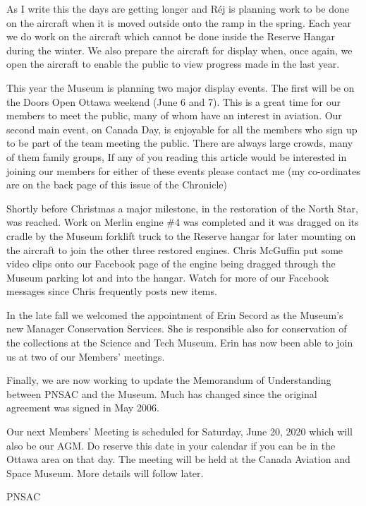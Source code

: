 
As I write this the days are getting longer and R\'{e}j is planning work to
be done on the aircraft when it is moved outside onto the ramp in the
spring. Each year we do work on the aircraft which cannot be done
inside the Reserve Hangar during the winter. We also prepare the
aircraft for display when, once again, we open the aircraft to enable
the public to view progress made in the last year.

This year the Museum is planning two major display events. The first will be
on the Doors Open Ottawa weekend (June 6 and 7). This is a great time
for our members to meet the public, many of whom have an interest in
aviation. Our second main event, on Canada Day, is enjoyable for all
the members who sign up to be part of the team meeting the public.
There are always large crowds, many of them family groups, If any of
you reading this article would be interested in joining our members for
either of these events please contact me (my co-ordinates are on the
back page of this issue of the Chronicle)

Shortly before Christmas a major milestone, in the  restoration of the
North Star, was reached. Work on Merlin engine \#4 was completed and it
was dragged on its cradle by the Museum forklift truck to the
Reserve hangar for later mounting on the aircraft to join the other
three restored engines. Chris McGuffin put some video clips onto our
Facebook page of the engine being dragged through the Museum parking
lot and into the hangar. Watch for more of our Facebook messages since
Chris frequently posts new items.

In the late fall we welcomed the appointment of Erin Secord as the
Museum's new Manager Conservation Services. She is responsible also for
conservation of the collections at the Science and Tech Museum. Erin
has now been able to join us at two of our Members' meetings.

Finally, we are now working to update the Memorandum of Understanding
between PNSAC and the Museum.  Much has changed since the original
agreement was signed in May 2006.

Our next Members' Meeting is scheduled for Saturday, June 20, 2020
which will also be our AGM. Do reserve this date in your calendar if
you can be in the Ottawa area on that day. The meeting will be held at
the Canada Aviation and Space Museum. More details will follow later.

\begin{footnotesize}
    \raggedleft PNSAC\\
\end{footnotesize}



